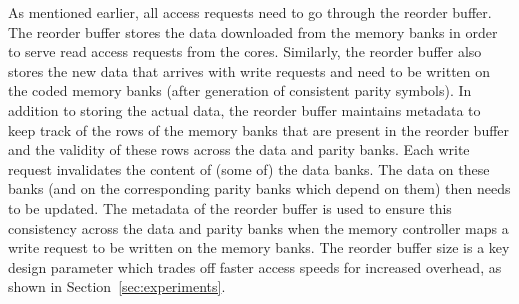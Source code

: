 As mentioned earlier, all access requests need to go through the reorder buffer. The reorder buffer stores the data downloaded from the memory banks in order to serve read access requests from the cores. Similarly, the reorder buffer also stores the new data that arrives with write requests and need to be written on the coded memory banks (after generation of consistent parity symbols). In addition to storing the actual data, the reorder buffer maintains metadata to keep track of the rows of the memory banks that are present in the reorder buffer and the validity of these rows across the data and parity banks. Each write request invalidates the content of (some of) the data banks. The data on these banks (and on the corresponding parity banks which depend on them) then needs to be updated. The metadata of the reorder buffer is used to ensure this consistency across the data and parity banks when the memory controller maps a write request to be written on the memory banks. The reorder buffer size is a key design parameter which trades off faster access speeds for increased overhead, as shown in Section~\ref{sec:experiments}.


